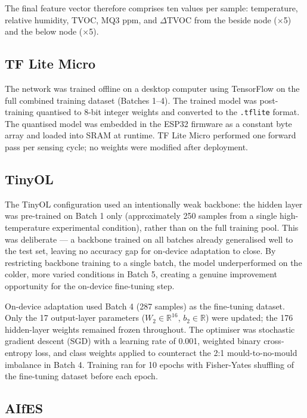 The final feature vector therefore comprises ten values per sample: temperature, relative humidity, TVOC, MQ3 ppm, and $\Delta$TVOC from the beside node ($\times$5) and the below node ($\times$5).

\subsection{TF Lite Micro}

The network was trained offline on a desktop computer using TensorFlow on the full combined training dataset (Batches 1--4). The trained model was post-training quantised to 8-bit integer weights and converted to the \texttt{.tflite} format. The quantised model was embedded in the ESP32 firmware as a constant byte array and loaded into SRAM at runtime. TF Lite Micro performed one forward pass per sensing cycle; no weights were modified after deployment.

\subsection{TinyOL}

The TinyOL configuration used an intentionally weak backbone: the hidden layer was pre-trained on Batch 1 only (approximately 250 samples from a single high-temperature experimental condition), rather than on the full training pool. This was deliberate --- a backbone trained on all batches already generalised well to the test set, leaving no accuracy gap for on-device adaptation to close. By restricting backbone training to a single batch, the model underperformed on the colder, more varied conditions in Batch 5, creating a genuine improvement opportunity for the on-device fine-tuning step.

On-device adaptation used Batch 4 (287 samples) as the fine-tuning dataset. Only the 17 output-layer parameters ($W_2 \in \mathbb{R}^{16}$, $b_2 \in \mathbb{R}$) were updated; the 176 hidden-layer weights remained frozen throughout. The optimiser was stochastic gradient descent (SGD) with a learning rate of 0.001, weighted binary cross-entropy loss, and class weights applied to counteract the 2:1 mould-to-no-mould imbalance in Batch 4. Training ran for 10 epochs with Fisher-Yates shuffling of the fine-tuning dataset before each epoch.

\subsection{AIfES}

